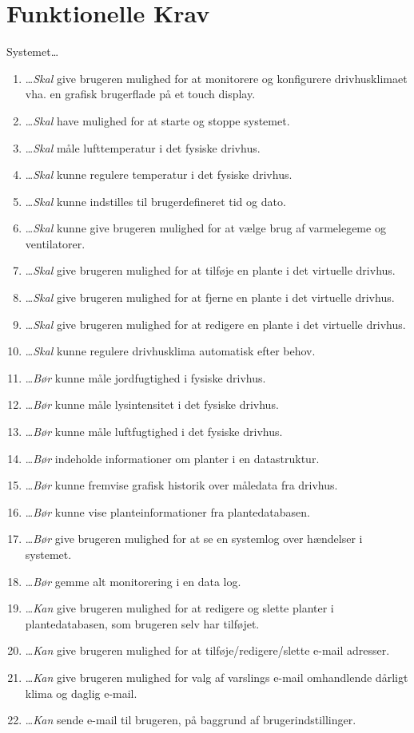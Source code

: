 \section{Funktionelle Krav}
Systemet\ldots
\begin{enumerate}\itemsep1pt \parskip0pt 
	\item \ldots \emph{Skal} give brugeren mulighed for at monitorere og konfigurere drivhusklimaet vha. en grafisk brugerflade på et touch display.
	\item \ldots \emph{Skal} have mulighed for at starte og stoppe systemet.
	\item \ldots \emph{Skal} måle lufttemperatur i det fysiske drivhus.
	\item \ldots \emph{Skal} kunne regulere temperatur i det fysiske drivhus.
	\item \ldots \emph{Skal} kunne indstilles til brugerdefineret tid og dato.
	\item \ldots \emph{Skal} kunne give brugeren mulighed for at vælge brug af varmelegeme og ventilatorer.
	\item \ldots \emph{Skal} give brugeren mulighed for at tilføje en plante i det virtuelle drivhus.
	\item \ldots \emph{Skal} give brugeren mulighed for at fjerne en plante i det virtuelle drivhus.
	\item \ldots \emph{Skal} give brugeren mulighed for at redigere en plante i det virtuelle drivhus.
	\item \ldots \emph{Skal} kunne regulere drivhusklima automatisk efter behov.
	\item \ldots \emph{Bør} kunne måle jordfugtighed i fysiske drivhus.
	\item \ldots \emph{Bør} kunne måle lysintensitet i det fysiske drivhus.
	\item \ldots \emph{Bør} kunne måle luftfugtighed i det fysiske drivhus.
	\item \ldots \emph{Bør} indeholde informationer om planter i en datastruktur.
	\item \ldots \emph{Bør} kunne fremvise grafisk historik over måledata fra drivhus.
	\item \ldots \emph{Bør} kunne vise planteinformationer fra plantedatabasen.
	\item \ldots \emph{Bør} give brugeren mulighed for at se en systemlog over hændelser i systemet.
	\item \ldots \emph{Bør} gemme alt monitorering i en data log.
	\item \ldots \emph{Kan} give brugeren mulighed for at redigere og slette planter i plantedatabasen, som brugeren selv har tilføjet.
	\item \ldots \emph{Kan} give brugeren mulighed for at tilføje/redigere/slette e-mail adresser.
	\item \ldots \emph{Kan} give brugeren mulighed for valg af varslings e-mail omhandlende dårligt klima og daglig e-mail.
	\item \ldots \emph{Kan} sende e-mail til brugeren, på baggrund af brugerindstillinger.
\end{enumerate}

